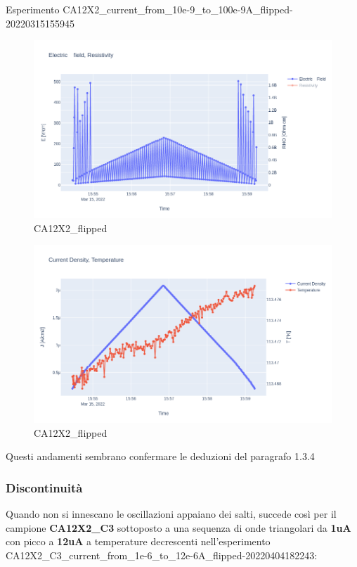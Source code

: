 \documentclass[11pt]{article}
\begin{document}
Esperimento
CA12X2\_current\_from\_10e-9\_to\_100e-9A\_flipped-20220315155945

\begin{figure}
\centering
\includegraphics{CA12X2_flipped-e-1.png}
\caption{CA12X2\_flipped}
\end{figure}

\begin{figure}
\centering
\includegraphics{CA12X2_flipped-j_t-1.png}
\caption{CA12X2\_flipped}
\end{figure}

Questi andamenti sembrano confermare le deduzioni del paragrafo 1.3.4

    \hypertarget{discontinuituxe0}{%
\subsubsection{Discontinuità}\label{discontinuituxe0}}

Quando non si innescano le oscillazioni appaiano dei salti, succede così
per il campione \textbf{CA12X2\_C3} sottoposto a una sequenza di onde
triangolari da \textbf{1uA} con picco a \textbf{12uA} a temperature
decrescenti nell'esperimento
CA12X2\_C3\_current\_from\_1e-6\_to\_12e-6A\_flipped-20220404182243:
\end{document}
